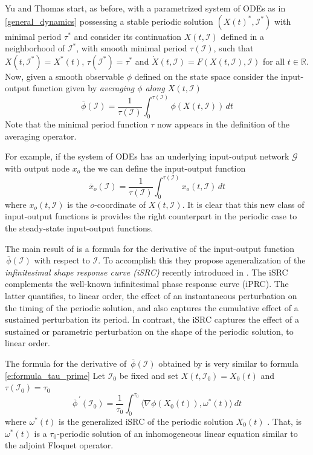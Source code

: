 \documentclass[a4paper,fleqn]{cas-dc}
\newcommand{\II}{{\mathcal I}}
\begin{document}
Yu and Thomas \cite{yu2022} start, as before, with a parametrized system of ODEs as in \ref{general_dynamics} possessing a
stable periodic solution $(X(t)^*,\II^*)$ with minimal period $\tau^*$ and consider its continuation $X(t,\II)$ defined in a neighborhood of $\II^*$, with smooth minimal period $\tau(\II)$, such that $X(t,\II^*) = X^*(t)$, $\tau(\II^*)=\tau^*$ and $\dot{X}(t,\II) = F(X(t,\II),\II)$ for all $t\in\mathbb{R}$.
Now, given a smooth observable $\phi$ defined on the state space consider the input-output function given by \emph{averaging $\phi$ along $X(t,\II)$}
\begin{equation} \label{e:average_IO}
 \overline{\!\phi}(\II) = \frac{1}{\tau(\II)}
 \int_{0}^{\tau(\II)} \!\!\!\!\!
 \phi(X(t,\II)) \,dt
\end{equation}
Note that the minimal period function $\tau$ now appears in the definition of the averaging operator.

For example, if the system of ODEs has an underlying input-output network $\mathcal{G}$ with output node $x_o$ the we can define the input-output function
\begin{equation} \label{e:average_x_o}
\overline{\!x}_o(\II) = \frac{1}{\tau(\II)}
 \int_{0}^{\tau(\II)} \!\!\!\!\!
 x_o(t,\II) \,dt
\end{equation}
where $x_o(t,\II)$ is the $o$-coordinate of $X(t,\II)$.
It is clear that this new class of input-output functions is provides the right counterpart in the periodic case to the steady-state input-output functions.

The main result of \cite{yu2022}  is a formula for the derivative of the input-output function $\,\overline{\!\phi}(\II)$ with respect to $\II$.
To accomplish this they propose ageneralization of the \emph{infinitesimal shape response curve (iSRC)} recently introduced in \cite{wgct2021}.
The iSRC complements the well-known infinitesimal phase response curve (iPRC). 
The latter quantifies, to linear order, the effect of an instantaneous perturbation on the timing of the periodic solution, and also captures the
cumulative effect of a sustained perturbation its period. 
In contrast, the iSRC captures the effect of a sustained or parametric perturbation on the shape of the periodic solution, to linear order.

The formula for the derivative of $\,\overline{\!\phi}(\II)$ obtained by \cite{yu2022} is very similar to formula \eqref{e:formula_tau_prime}
Let $\II_0$ be fixed and set $X(t,\II_0)=X_0(t)$ and $\tau(\II_0)=\tau_0$
\begin{equation} \label{e:formula_barphi_prime}
 \overline{\!\phi}^{\,\prime}(\II_0) = \frac{1}{\tau_0}
 \int_{0}^{\tau_0} \!\!\!\!
 \langle \nabla\phi(X_0(t)), \omega^*(t) \rangle \,dt
\end{equation}
where $\omega^*(t)$ is the generalized iSRC of the periodic solution $X_0(t)$ \cite{yu2022}.
That, is $\omega^*(t)$ is a $\tau_0$-periodic solution of an inhomogeneous linear equation similar to the adjoint Floquet operator.
\end{document}
